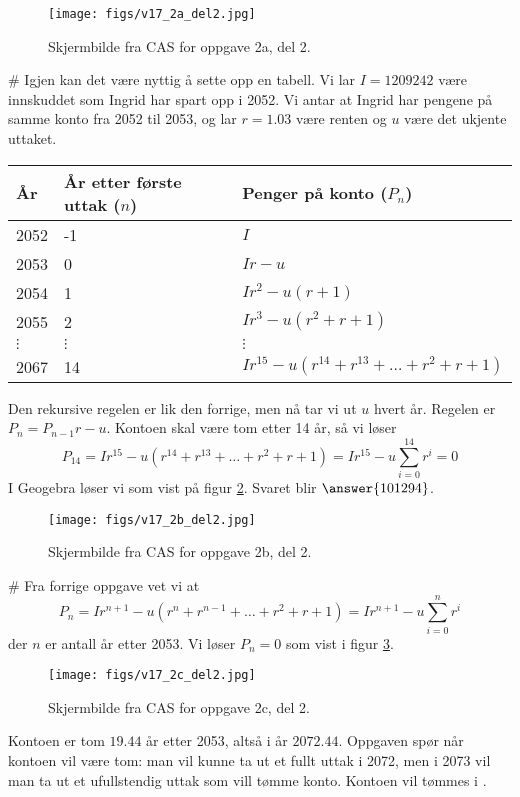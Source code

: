 \begin{easylist}[enumerate]
	\begin{figure}[th!]
		\centering
		\texttt{[image: figs/v17\_2a\_del2.jpg]}
		\caption{Skjermbilde fra CAS for oppgave 2a, del 2.}
		\label{fig:cas1}
	\end{figure}
	# Igjen kan det være nyttig å sette opp en tabell.
	Vi lar $I = 1209242$ være innskuddet som Ingrid har spart opp i 2052. Vi antar at Ingrid har pengene på samme konto fra 2052 til 2053, og lar $r = 1.03$ være renten og $u$ være det ukjente uttaket.
		\begin{center}
		\begin{tabular}{lll}
			\textbf{År} & \textbf{År etter første uttak} ($n$) & \textbf{Penger på konto} ($P_n$) \\ \hline
			2052 & -1 & $I$ \\
			2053 & 0 & $Ir - u$ \\
			2054 & 1 & $Ir^2 - u(r+1)$ \\
			2055 & 2 & $Ir^3 - u(r^2 + r+1)$ \\
			$\vdots$ & $\vdots$ & $\vdots$ \\
			2067 & 14 & $Ir^{15} - u (r^{14} + r^{13} + \dots + r^2 + r + 1)$
		\end{tabular}
	\end{center}
	Den rekursive regelen er lik den forrige, men nå tar vi ut $u$ hvert år. Regelen er $P_n = P_{n-1}r - u$. Kontoen skal være tom etter 14 år, så vi løser
	\begin{equation*}
		P_{14} = Ir^{15} - u (r^{14} + r^{13} + \dots + r^2 + r + 1) = Ir^{15} - u \sum_{i = 0}^{14} r^i = 0
	\end{equation*}
	I Geogebra løser vi som vist på figur \ref{fig:cas2}. Svaret blir $\answer{101294}$.
	\begin{figure}[th!]
		\centering
		\texttt{[image: figs/v17\_2b\_del2.jpg]}
		\caption{Skjermbilde fra CAS for oppgave 2b, del 2.}
		\label{fig:cas2}
	\end{figure}
	

	# Fra forrige oppgave vet vi at
	\begin{equation*}
		P_{n} = Ir^{n+1} - u (r^{n} + r^{n-1} + \dots + r^2 + r + 1) = Ir^{n+1} - u \sum_{i = 0}^{n} r^i
	\end{equation*}
	der $n$ er antall år etter 2053.
	Vi løser $P_n = 0$ som vist i figur \ref{fig:cas3}.
	\begin{figure}[th!]
		\centering
		\texttt{[image: figs/v17\_2c\_del2.jpg]}
		\caption{Skjermbilde fra CAS for oppgave 2c, del 2.}
		\label{fig:cas3}
	\end{figure}
	Kontoen er tom $19.44$ år etter 2053, altså i år $2072.44$.
	Oppgaven spør når kontoen vil være tom:
	man vil kunne ta ut et fullt uttak i 2072, men i 2073 vil man ta ut et ufullstendig uttak som vill tømme konto. Kontoen vil tømmes i .
\end{easylist}


